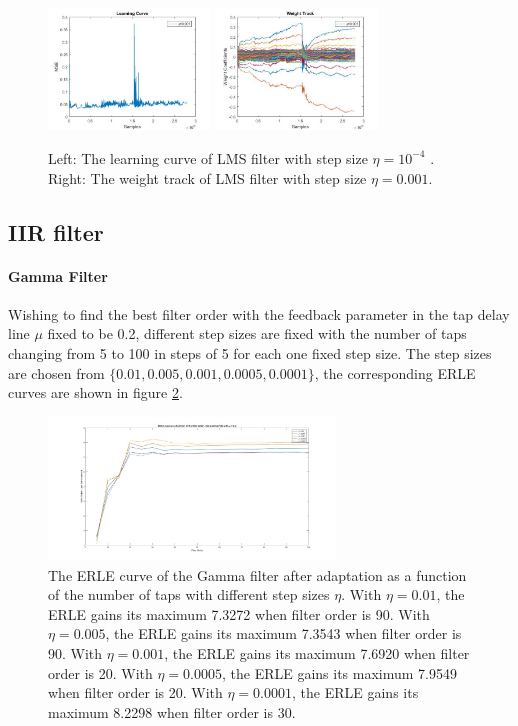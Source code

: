 \documentclass[conference]{IEEEtran}
\begin{document}
	\begin{figure}[htbp]
	\centering
	\includegraphics[width = 1.7in]{LMS_LC_eta1.jpg}
	\includegraphics[width=1.7in]{LMS_WT_6.jpg}
	\caption{Left: The learning curve of LMS filter with step size $\eta = 10^{-4}$ . Right: The weight track of LMS filter with step size $\eta = 0.001$.}
	\label{LMSeta6}
	\end{figure}


	\subsection{IIR filter}
		\paragraph{Gamma Filter}  Wishing to find the best filter order with the feedback parameter in the tap delay line $\mu$ fixed to be 0.2, different step sizes are fixed with the number of taps changing from 5 to 100 in steps of 5 for each one fixed step size. The step sizes are chosen from $\{ 0.01, 0.005, 0.001, 0.0005, 0.0001\}$, the corresponding ERLE curves are shown in figure \ref{ERLEGammaall}.
		
	\begin{figure}[tbp]
	\centerline{\includegraphics[width=3in]{GammaERLEaLL.jpg}}
	\caption{The ERLE curve of the Gamma filter after adaptation as a function of the number of taps with different step sizes $\eta$. With $\eta = 0.01$, the ERLE gains its maximum 7.3272 when filter order is 90. With $\eta = 0.005$, the ERLE gains its maximum 7.3543 when filter order is 90. With $\eta = 0.001$, the ERLE gains its maximum 7.6920 when filter order is 20. With $\eta = 0.0005$, the ERLE gains its maximum 7.9549 when filter order is 20. With $\eta = 0.0001$, the ERLE gains its maximum 8.2298 when filter order is 30.}
	\label{ERLEGammaall}
	\end{figure}
	
\end{document}
